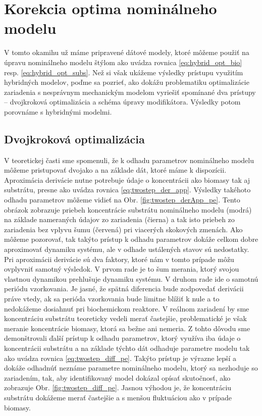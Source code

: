 \section{Korekcia optima nominálneho modelu}
V tomto okamihu už máme pripravené dátové modely, ktoré môžeme použiť na úpravu nominálneho modelu štýlom ako uvádza rovnica \ref{eq:hybrid_opt_bio} resp. \ref{eq:hybrid_opt_subs}. Než si však ukážeme výsledky prístupu využitím hybridných modelov, poďme sa pozrieť, ako dokážu problematiku optimalizácie zariadenia s nesprávnym mechanickým modelom vyriešiť spomínané dva prístupy -- dvojkroková optimalizácia a schéma úpravy modifikátora. Výsledky potom porovnáme s hybridnými modelmi. 

\subsection{Dvojkroková optimalizácia}
V teoretickej časti sme spomenuli, že k odhadu parametrov nominálneho modelu môžeme pristupovať dvojako a na základe dát, ktoré máme k dispozícii. Aproximácia derivácie nutne potrebuje údaje o koncentrácii ako biomasy tak aj substrátu, presne ako uvádza rovnica \eqref{eq:twostep_der_app}. Výsledky takéhoto odhadu parametrov môžeme vidieť na Obr. \ref{fig:twostep_derApp_pe}. Tento obrázok zobrazuje priebeh koncentrácie substrátu nominálneho modelu (modrá) na základe nameraných údajov zo zariadenia (čierna) a tak isto priebeh zo zariadenia bez vplyvu šumu (červená) pri viacerých skokových zmenách. Ako môžeme pozorovať, tak takýto prístup k odhadu parametrov dokáže celkom dobre aproximovať dynamiku systému, ale v odhade ustálených stavov sú nedostatky. Pri aproximácii derivácie sú dva faktory, ktoré nám v tomto prípade môžu ovplyvniť samotný výsledok. V prvom rade je to šum merania, ktorý svojou vlastnou dynamikou
prehlušuje dynamiku systému. V druhom rade ide o samotnú periódu vzorkovania. Je jasné, že spätná diferencia bude zodpovedať derivácii práve vtedy, ak sa perióda vzorkovania bude limitne blížiť k nule a to nedokážeme dosiahnuť pri biochemickom reaktore. V reálnom zariadení by sme koncentráciu substrátu teoreticky vedeli merať častejšie, problematické je však meranie koncentrácie biomasy, ktorá sa bežne ani nemeria. Z tohto dôvodu sme demonštrovali ďalší prístup k odhadu parametrov, ktorý využíva iba údaje o koncentrácii substrátu a na základe týchto dát odhaduje parametre modelu tak ako uvádza rovnica \eqref{eq:twostep_diff_pe}. Takýto prístup je výrazne lepší a dokáže  odhadnúť neznáme parametre nominálneho modelu, ktorý sa nezhoduje so zariadením, tak, aby identifikovaný model dokázal opísať skutočnosť, ako zobrazuje Obr. \ref{fig:twostep_diff_pe}. Jasnou výhodou je, že koncentráciu substrátu dokážeme merať častejšie a s menšou fluktuáciou ako v prípade biomasy. 

